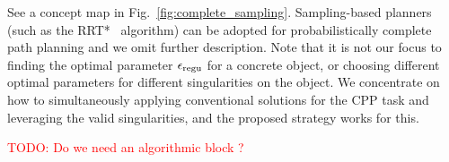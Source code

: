 \documentclass[Afour,sageh,times]{sagej}
\begin{document}
See a concept map in Fig.~\ref{fig:complete_sampling}. 
Sampling-based planners (such as the RRT*~\cite{Karaman2011Sampling} algorithm) can be adopted for probabilistically complete path planning and we omit further description. 
Note that it is not our focus to finding the optimal parameter $\epsilon_{\rm regu}$ for a concrete object, or choosing different optimal parameters for different singularities on the object. 
We concentrate on how to simultaneously applying conventional solutions for the CPP task and leveraging the valid singularities, and the proposed strategy works for this. 

\textcolor{red}{TODO: Do we need an algorithmic block ?}

%

\end{document}
